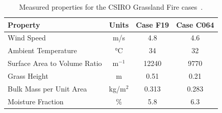 \begin{table}[ht]
\centering
\caption[Measured properties for the CSIRO Grassland Fire cases]{Measured properties for the CSIRO Grassland Fire cases~\cite{Cheney:IJWF1993}.}
\label{Properties_Grasses}
\begin{tabular}{|l|c|c|c|}
\hline
Property                        & Units         & Case F19      & Case C064     \\ \hline \hline
Wind Speed                      & m/s           & 4.8           & 4.6           \\ \hline
Ambient Temperature             & \unit{\degreeCelsius}     & 34            & 32            \\ \hline
Surface Area to Volume Ratio    & m$^{-1}$      & 12240         & 9770          \\ \hline
Grass Height                    & m             & 0.51          & 0.21          \\ \hline
Bulk Mass per Unit Area         & kg/m$^2$      & 0.313         & 0.283         \\ \hline
Moisture Fraction               & \%            & 5.8           & 6.3           \\ \hline
\end{tabular}
\end{table}

